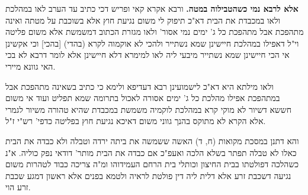 \documentclass[12pt, openany]{book}
\newcommand{\sethebfont}{
\fontsize{10.5pt}{21.0pt} \selectfont
}
\newcommand{\twocol}[1]{
	{\sethebfont \begin{multicols}{2}
			#1
	\end{multicols}}	
}
\begin{document}
\twocol{\textbf{אלא לרבא נמי כשהטבילוה במטה.}  ורבא אקרא קאי ופריש דכי כתיב עד הערב לאו במהלכת ולאו במכבדת את הבית דא"כ תיפוק לי משום נגיעת חוץ אלא בשוכבת על מטתה ואינה מתהפכת אבל מתהפכת כל ג' ימים נמי אסור' ולאו מגזרת הכתוב דמשמשת אלא משום פליטה וי"ל דאפילו במהלכת חיישינן שמא נשתייר ולהכי לא אוקמוה לקרא (בהדי) [בהכי] וכי אקשינן אי הכי חיישינן שמא נשתייר מיבעי ליה לאו למימרא דלא חיישינן אלא לומר דרבא לא בכי האי גוונא מיירי.\par ולאו מילתא היא דא"כ לישמועינן רבא דעדיפא ולימא כי כתיב בשאינה מתהפכת אבל במתהפכת אפילו מהלכת כל ג' ימים אסורה לאכול בתרומה שמא תפליט ועוד אי משום חששא דשיור לא מוקי קרא במהלכת לוקמיה משמשת במכבדת שהיא טהורה משיור לגמרי אלא הקרא לא מתוקס בהנך גווני משום דאיכא נגיעת חוץ בפליטה כדפי' רש"י ז"ל.\par  והא דתנן במסכת מקואות (ח, ד) האשה ששמשה את ביתה ירדה וטבלה ולא כבדה את הבית כאלו לא טבלה תפתר בשלא הלכה ואעפ"כ אם כבדה את הבית מותר' דודאי נפק כוליה. א"נ כשהלכה דפולטתו בבית החיצון וכותלי בית הרחם העמידוהו ומ"ה צריכה כבוד לטהרות משום נגיעה דשכבת זרע אלא דלית ליה דין פולטת לראיה ולטמא בפנים אלא ראשון דמגע שכבת זרע הוי. 
}
\end{document}
